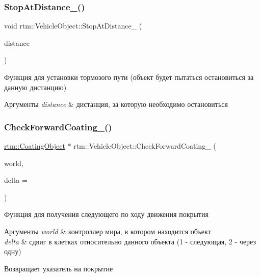 \subsubsection{\texorpdfstring{Stop\+At\+Distance\+\_\+()}{StopAtDistance\_()}}
{\footnotesize\ttfamily void rtm\+::\+Vehicle\+Object\+::\+Stop\+At\+Distance\+\_\+ (\begin{DoxyParamCaption}\item[{float}]{distance }\end{DoxyParamCaption})\hspace{0.3cm}{\ttfamily [protected]}}

Функция для установки тормозого пути (объект будет пытаться остановиться за данную дистанцию) 
\begin{DoxyParams}{Аргументы}
{\em distance} & дистанция, за которую необходимо остановиться \\
\hline
\end{DoxyParams}
\mbox{\label{classrtm_1_1_vehicle_object_a3756c9823f032ce8647343291fdbd00b}} 
\subsubsection{\texorpdfstring{Check\+Forward\+Coating\+\_\+()}{CheckForwardCoating\_()}}
{\footnotesize\ttfamily \hyperlink{classrtm_1_1_coating_object}{rtm\+::\+Coating\+Object} $\ast$ rtm\+::\+Vehicle\+Object\+::\+Check\+Forward\+Coating\+\_\+ (\begin{DoxyParamCaption}\item[{\hyperlink{classrtm_1_1_world_controller}{World\+Controller} $\ast$const}]{world,  }\item[{int}]{delta = {} }\end{DoxyParamCaption})\hspace{0.3cm}{\ttfamily [protected]}}

Функция для получения следующего по ходу движения покрытия 
\begin{DoxyParams}{Аргументы}
{\em world} & контроллер мира, в котором находится объект \\
\hline
{\em delta} & сдвиг в клетках относительно данного объекта (1 -\/ следующая, 2 -\/ через одну) \\
\hline
\end{DoxyParams}
\begin{DoxyReturn}{Возвращает}
указатель на покрытие 
\end{DoxyReturn}
\mbox{\label{classrtm_1_1_vehicle_object_a96e80f98cc6aa50ab3f822e06223e345}} 
